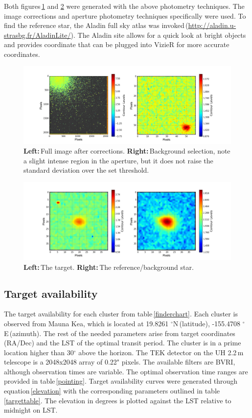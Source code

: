 \documentclass[onecolumn]{aastex6}
\begin{document}
Both figures\,\ref{galaxy} and \ref{star} were generated with the above photometry techniques. The image corrections and aperture photometry techniques specifically were used. To find the reference star, the Aladin full sky atlas was invoked\,(\url{http://aladin.u-strasbg.fr/AladinLite/}). The Aladin site allows for a quick look at bright objects and provides coordinate that can be plugged into VizieR for more accurate coordinates.

\begin{figure}[ht]
  \centering
  \includegraphics[scale=0.4]{galaxy.png}%
  \caption{\textbf{Left:}\,Full image after corrections. \textbf{Right:}\,Background selection, note a slight intense region in the aperture, but it does not raise the standard deviation over the set threshold.}
  \label{galaxy}
\end{figure}

\begin{figure}[ht]
  \centering
  \includegraphics[scale=0.4]{star.png}%
  \caption{\textbf{Left:}\,The target. \textbf{Right:}\,The reference/background star.}
  \label{star}
\end{figure}

\subsection{Target availability}

The target availability for each cluster from table\,\ref{finderchart}. Each cluster is observed from Mauna Kea, which is located at 19.8261 $^\circ$N\,(latitude), -155.4708 $^\circ$E\,(azimuth). The rest of the needed parameters arise from target coordinates\,(RA/Dec) and the LST of the optimal transit period. The cluster is in a prime location higher than 30$^\circ$ above the horizon. The TEK detector on the UH 2.2\,m telescope is a 2048x2048 array of 0.22" pixels. The available filters are BVRI, although observation times are variable. The optimal observation time ranges are provided in table\,\ref{pointing}. Target availability curves were generated through equation\,\ref{elevation} with the corresponding parameters outlined in table\,\ref{targettable}. The elevation in degrees is plotted against the LST relative to midnight on LST.
\end{document}
